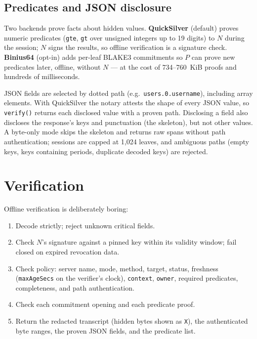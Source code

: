 \documentclass[11pt,a4paper]{article}
\begin{document}
\subsection{Predicates and JSON disclosure}

Two backends prove facts about hidden values.
\textbf{QuickSilver} (default) proves numeric predicates (\texttt{gte},
\texttt{gt} over unsigned integers up to 19 digits) to $N$ during the session;
$N$ signs the results, so offline verification is a signature check.
\textbf{Binius64} (opt-in) adds per-leaf BLAKE3 commitments so $P$ can prove
new predicates later, offline, without $N$ --- at the cost of 734--760~KiB
proofs and hundreds of milliseconds.

JSON fields are selected by dotted path (e.g.\ \texttt{users.0.username}),
including array elements.
With QuickSilver the notary attests the shape of every JSON value, so
\texttt{verify()} returns each disclosed value with a proven path.
Disclosing a field also discloses the response's keys and punctuation (the
skeleton), but not other values.
A byte-only mode skips the skeleton and returns raw spans without path
authentication; sessions are capped at 1,024 leaves, and ambiguous paths
(empty keys, keys containing periods, duplicate decoded keys) are rejected.

\section{Verification}

Offline verification is deliberately boring:

\begin{enumerate}[leftmargin=2em]
\item Decode strictly; reject unknown critical fields.
\item Check $N$'s signature against a pinned key within its validity window;
fail closed on expired revocation data.
\item Check policy: server name, mode, method, target, status, freshness
(\texttt{maxAgeSecs} on the verifier's clock), \texttt{context},
\texttt{owner}, required predicates, completeness, and path authentication.
\item Check each commitment opening and each predicate proof.
\item Return the redacted transcript (hidden bytes shown as \texttt{X}),
the authenticated byte ranges, the proven JSON fields, and the predicate list.
\end{enumerate}
\end{document}
